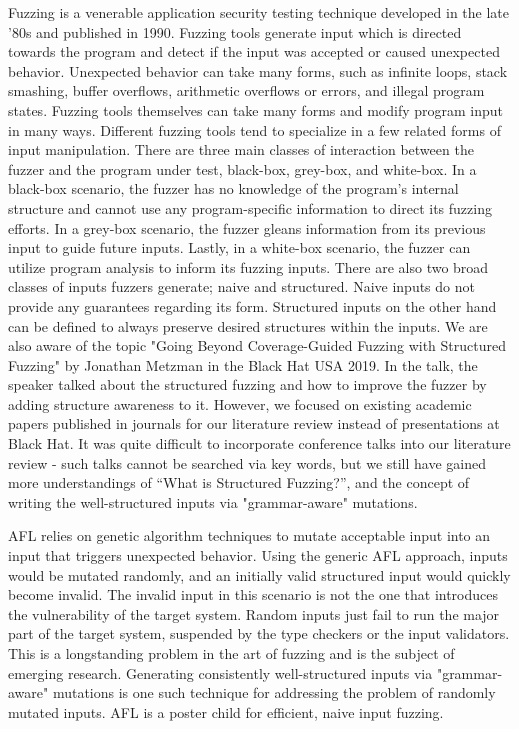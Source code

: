 \documentclass[12pt]{diazessay}
\begin{document}
Fuzzing is a venerable application security testing technique developed in the late '80s\cite{Barton1988} and published in 1990\cite{Miller1990}.
Fuzzing tools generate input which is directed towards the program and detect if the input was accepted or caused unexpected behavior.
Unexpected behavior can take many forms, such as infinite loops, stack smashing, buffer overflows, arithmetic overflows or errors, and illegal program states.
Fuzzing tools themselves can take many forms\cite{ModelBasedFuzzing}\cite{GrammarBasedFuzzing}\cite{ProtocolBasedFuzzing} and modify program input in many ways.
Different fuzzing tools tend to specialize in a few related forms of input\cite{InputDiversity} manipulation.
There are three main classes of interaction between the fuzzer and the program under test, black-box\cite{takanen2018fuzzing}, grey-box, and white-box\cite{fuzzingsurvey}.
In a black-box scenario, the fuzzer has no knowledge of the program's internal structure and cannot use any program-specific information to direct its fuzzing efforts.
In a grey-box scenario, the fuzzer gleans information from its previous input to guide future inputs.
Lastly, in a white-box scenario, the fuzzer can utilize program analysis to inform its fuzzing inputs.
There are also two broad classes of inputs fuzzers generate; naive and structured\cite{fuzzingsurvey}.
Naive inputs do not provide any guarantees regarding its form.
Structured inputs on the other hand can be defined to always preserve desired structures within the inputs.
We are also aware of the topic "Going Beyond Coverage-Guided Fuzzing with Structured Fuzzing" by Jonathan Metzman in the Black Hat USA 2019\cite{blackhat2019}.
In the talk, the speaker talked about the structured fuzzing and how to improve the fuzzer by adding structure awareness to it. 
However, we focused on existing academic papers published in journals for our literature review instead of presentations at Black Hat.
It was quite difficult to incorporate conference talks into our literature review - such talks cannot be searched via key words, but we still have gained more understandings of “What is Structured Fuzzing?”, and the concept of writing the well-structured inputs via "grammar-aware" mutations.

AFL\cite{AFL_page} relies on genetic algorithm techniques\cite{InputMutationAlgorithm} to mutate acceptable input into an input that triggers unexpected behavior.
Using the generic AFL approach, inputs would be mutated randomly, and an initially valid structured input would quickly become invalid.
The invalid input in this scenario is not the one that introduces the vulnerability of the target system.
Random inputs just fail to run the major part of the target system, suspended by the type checkers or the input validators.
This is a longstanding problem in the art of fuzzing and is the subject of emerging research.
Generating consistently well-structured inputs\cite{structuredInput} via "grammar-aware" mutations is one such technique for addressing the problem of randomly mutated inputs.
AFL is a poster child for efficient, naive input fuzzing.
\end{document}
